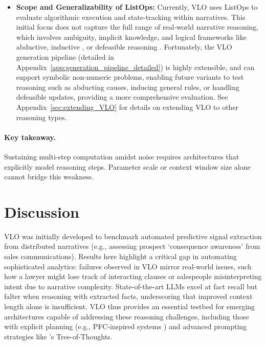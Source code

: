 \documentclass{article}
\begin{document}
\begin{itemize}
  \item \textbf{Scope and Generalizability of ListOps:} Currently, VLO uses ListOps to evaluate algorithmic execution and state-tracking within narratives. This initial focus does not capture the full range of real‐world narrative reasoning, which involves ambiguity, implicit knowledge, and logical frameworks like abductive, inductive \citep{abductive-deductive-inductive-reasoning, inductive-reasoning}, or defeasible reasoning \citep{symtex, Leidinger2024LLMsNonmonotonic}. Fortunately, the VLO generation pipeline (detailed in Appendix~\ref{app:generation_pipeline_detailed}) is highly extensible, and can support symbolic non-numeric problems, enabling future variants to test reasoning such as abducting causes, inducing general rules, or handling defeasible updates, providing a more comprehensive evaluation. See Appendix~\ref{sec:extending_VLO} for details on extending VLO to other reasoning types.

\end{itemize}

\paragraph{Key takeaway.}
Sustaining multi-step computation amidst noise requires architectures that explicitly model reasoning steps. Parameter scale or context window size alone cannot bridge this weakness.

\section{Discussion}
VLO was initially developed to benchmark automated predictive signal extraction from distributed narratives (e.g., assessing prospect `consequence awareness' from sales communications). Results here highlight a critical gap in automating sophisticated analytics: failures observed in VLO mirror real-world issues, such how a lawyer might lose track of interacting clauses or salespeople misinterpreting intent due to narrative complexity. State-of-the-art LLMs excel at fact recall but falter when reasoning with extracted facts, underscoring that improved context length alone is insufficient. VLO thus provides an essential testbed for emerging architectures capable of addressing these reasoning challenges, including those with explicit planning (e.g., PFC-inspired systems \citep{pfc}) and advanced prompting strategies like \cite{treeofthoughts}'s Tree-of-Thoughts.
\end{document}
